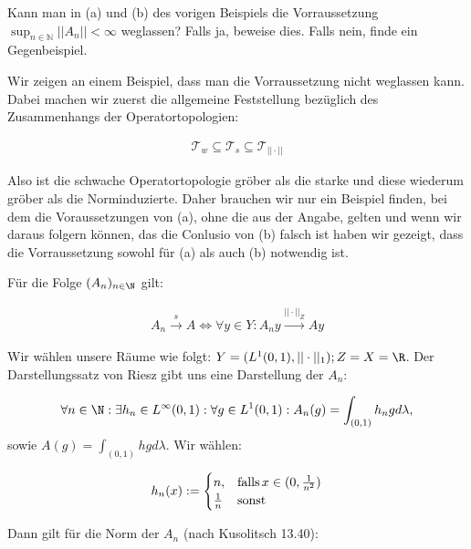 \begin{exercise}
Kann man in (a) und (b) des vorigen Beispiels die Vorraussetzung
$\sup_{n \in \mathbb{N}} ||A_n|| < \infty$ weglassen?
Falls ja, beweise dies. Falls nein, finde ein Gegenbeispiel.
\end{exercise}
\begin{solution}

Wir zeigen an einem Beispiel, dass man die Vorraussetzung nicht weglassen kann.
Dabei machen wir zuerst die allgemeine Feststellung bezüglich des Zusammenhangs der
Operatortopologien:

\begin{align*}
  \mathcal{T}_w \subseteq \mathcal{T}_s \subseteq \mathcal{T}_{||\cdot||}
\end{align*}

Also ist die schwache Operatortopologie gröber als die starke und diese wiederum
gröber als die Norminduzierte. Daher brauchen wir nur ein Beispiel finden, bei dem
die Voraussetzungen von (a), ohne die aus der Angabe, gelten und wenn wir daraus folgern können, das die Conlusio von (b) falsch ist haben wir gezeigt, dass die Vorraussetzung sowohl
für (a) als auch (b) notwendig ist.

Für die Folge $(A_n)_{n \in \N}$ gilt:

\begin{align*}
  A_n \stackrel{s}{\rightarrow} A
  \Leftrightarrow
  \forall y \in Y: A_n y \stackrel{||\cdot||_Z}{\rightarrow} Ay
\end{align*}

Wir wählen unsere Räume wie folgt: $Y = (L^1 (0,1), ||\cdot||_1) ; Z=X=\R$. Der
Darstellungssatz von Riesz gibt uns eine Darstellung der $A_n$:

\begin{align*}
  \forall n \in \N: \exists h_n \in L^{\infty}(0,1):
  \forall g \in L^1 (0,1): A_n(g) = \int_{(0,1)}h_n g d\lambda,
\end{align*}
sowie $A(g)= \int_{(0,1)} hg d\lambda$.
Wir wählen:

\begin{align*}
  h_n (x):= \begin{cases}
    n, & \text{falls\,} x \in (0,\frac{1}{n^2}) \\
    \frac{1}{n} & \text{sonst}
  \end{cases}
\end{align*}

Dann gilt für die Norm der $A_n$ (nach Kusolitsch 13.40):


\end{solution}
